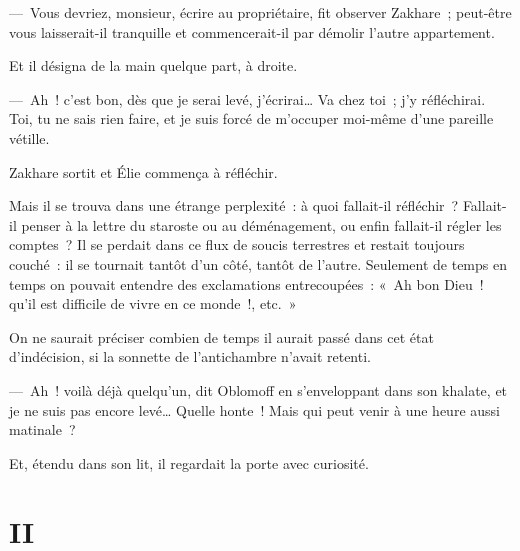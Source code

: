 \documentclass[french,twoside]{book} %
\begin{document}
— Vous devriez, monsieur, écrire au propriétaire, fit observer Zakhare ; peut-être vous laisserait-il tranquille et commencerait-il par démolir l’autre appartement.\par
Et il désigna de la main quelque part, à droite.\par
— Ah ! c’est bon, dès que je serai levé, j’écrirai… Va chez toi ; j’y réfléchirai. Toi, tu ne sais rien faire, et je suis forcé de m’occuper moi-même d’une pareille vétille.\par
Zakhare sortit et Élie commença à réfléchir.\par
Mais il se trouva dans une étrange perplexité : à quoi fallait-il réfléchir ? Fallait-il penser à la lettre du staroste ou au déménagement, ou enfin fallait-il régler les comptes ? Il se perdait dans ce flux de soucis terrestres et restait toujours couché : il se tournait tantôt d’un côté, tantôt de l’autre. Seulement de temps en temps on pouvait entendre des exclamations entrecoupées : « Ah bon Dieu ! qu’il est difficile de vivre en ce monde !, etc. »\par
On ne saurait préciser combien de temps il aurait passé dans cet état d’indécision, si la sonnette de l’antichambre n’avait retenti.\par
— Ah ! voilà déjà quelqu’un, dit Oblomoff en s’enveloppant dans son khalate, et je ne suis pas encore levé… Quelle honte ! Mais qui peut venir à une heure aussi matinale ?\par
Et, étendu dans son lit, il regardait la porte avec curiosité.
\section[{II}]{II}\renewcommand{\leftmark}{II}
\end{document}
